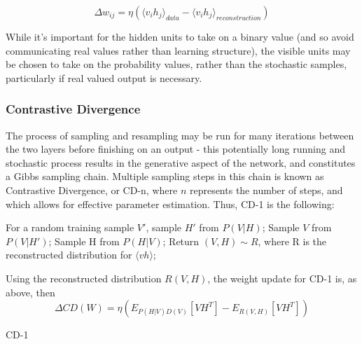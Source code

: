 \documentclass[a4paper,11pt,oneside]{article}
\theoremstyle{plain}
\theoremstyle{definition}
\begin{document}
\begin{equation}
\Delta w_{ij} = \eta (\langle v_ih_j\rangle_{data} - \langle v_ih_j\rangle_{reconstruction})
\end{equation}

While it's important for the hidden units to take on a binary value (and so avoid communicating real values rather than learning structure), the visible units may be chosen to take on the probability values, rather than the stochastic samples, particularly if real valued output is necessary. 

\subsubsection{Contrastive Divergence}\label{imp_CD}

The process of sampling and resampling may be run for many iterations between the two layers before finishing on an output - this potentially long running and stochastic process results in the generative aspect of the network, and constitutes a Gibbs sampling chain. Multiple sampling steps in this chain is known as Contrastive Divergence, or CD-n, where $n$ represents the number of steps, and which allows for effective parameter estimation. Thus, CD-1 is the following:\newline


\begin{algorithm}[H]
	
	\texttt{}\newline
	
	For a random training sample $V'$, sample $H'$ from $P(V|H)$;\newline
	Sample $V$ from $P(V|H')$;\newline
	Sample H from $P(H|V)$;\newline
	Return $(V,H) \sim R $, where R is the reconstructed distribution for $\langle vh \rangle$;\newline
	
	Using the reconstructed distribution $R(V,H)$, the weight update for CD-1 is, as above, then 
	\begin{equation}
	\Delta CD(W) = \eta( E_{P(H|V)D(V)}[VH^T] - E_{R(V,H)}[VH^T])
	\end{equation}
	
	
	
	\label{algo_cd1}
	\caption{CD-1}
\end{algorithm}
\end{document}
